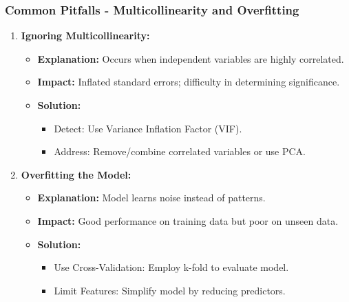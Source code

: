 \documentclass[aspectratio=169]{beamer}
\begin{document}
\begin{frame}[fragile]
    \frametitle{Common Pitfalls - Multicollinearity and Overfitting}
    \begin{enumerate}
        \item \textbf{Ignoring Multicollinearity:}
        \begin{itemize}
            \item \textbf{Explanation:} Occurs when independent variables are highly correlated.
            \item \textbf{Impact:} Inflated standard errors; difficulty in determining significance.
            \item \textbf{Solution:}
            \begin{itemize}
                \item Detect: Use Variance Inflation Factor (VIF).
                \item Address: Remove/combine correlated variables or use PCA.
            \end{itemize}
        \end{itemize}
        
        \item \textbf{Overfitting the Model:}
        \begin{itemize}
            \item \textbf{Explanation:} Model learns noise instead of patterns.
            \item \textbf{Impact:} Good performance on training data but poor on unseen data.
            \item \textbf{Solution:}
            \begin{itemize}
                \item Use Cross-Validation: Employ k-fold to evaluate model.
                \item Limit Features: Simplify model by reducing predictors.
            \end{itemize}
        \end{itemize}
    \end{enumerate}
\end{frame}
\end{document}
